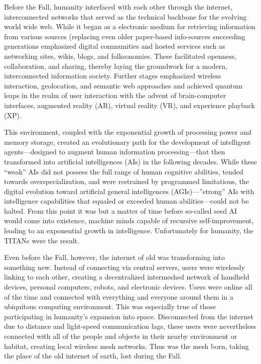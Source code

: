 Before the Fall, humanity interfaced with each other 
through the internet, interconnected networks that 
served as the technical backbone for the evolving
world wide web. While it began as a electronic
medium for retrieving information from various 
sources (replacing even older paper-based info-sources
succeeding generations emphasized digital
communities and hosted services such as networking 
sites, wikis, blogs, and folksonomies. These facilitated
openness, collaboration, and sharing, thereby
laying the groundwork for a modern, interconnected 
information society. Further stages emphasized wireless
interaction, geolocation, and semantic web approaches
and achieved quantum leaps in the realm
of user interaction with the advent of brain-computer 
interfaces, augmented reality (AR), virtual reality 
(VR), and experience playback (XP).

This environment, coupled with the exponential 
growth of processing power and memory storage, created
an evolutionary path for the development of intelligent
agents—designed to augment human information
processing—that then transformed into artificial
intelligences (AIs) in the following decades. While these 
``weak'' AIs did not possess the full range of human 
cognitive abilities, tended towards overspecialization, 
and were restrained by programmed limitations, the 
digital evolution toward artificial general intelligences 
(AGIs)—''strong'' AIs with intelligence capabilities 
that equaled or exceeded human abilities—could not 
be halted. From this point it was but a matter of time 
before so-called seed AI would come into existence, 
machine minds capable of recursive self-improvement, 
leading to an exponential growth in intelligence. Unfortunately
for humanity, the TITANs were the result.

Even before the Fall, however, the internet of old 
was transforming into something new. Instead of connecting
via central servers, users were wirelessly linking
to each other, creating a decentralized intermeshed
network of handheld devices, personal computers, 
robots, and electronic devices. Users were online all of 
the time and connected with everything and everyone 
around them in a ubiquitous computing environment. 
This was especially true of those participating in 
humanity's expansion into space. Disconnected from 
the internet due to distance and light-speed communication
lags, these users were nevertheless connected
with all of the people and objects in their nearby 
environment or habitat, creating local wireless mesh 
networks. Thus was the mesh born, taking the place 
of the old internet of earth, lost during the Fall.

